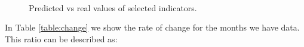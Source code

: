 \begin{figure}[h!]
	 \\
	\caption{Predicted vs real values of selected indicators.}
	\label{fig:sarima}
\end{figure}

In Table \ref{table:change} we show the rate of change for the months we have data. This ratio can be described as:

